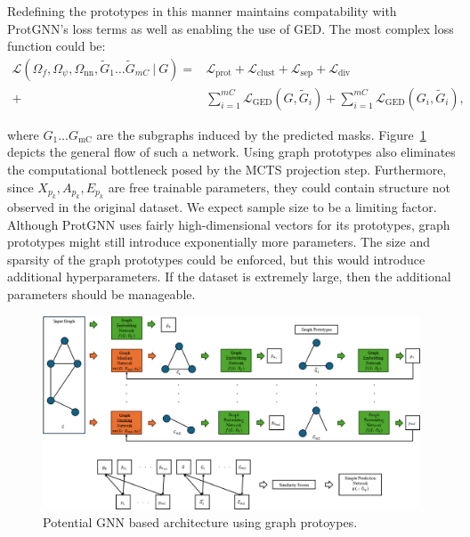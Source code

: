 \documentclass[
  11pt,
  letterpaper,
]{article}
\begin{document}
Redefining the prototypes in this manner maintains compatability with
ProtGNN's loss terms as well as enabling the use of GED. The most
complex loss function could be:\\
\begin{equation}
    \begin{split}
        \mathcal{L}(\Omega_f, \Omega_\psi, \Omega_\text{nn}, \tilde{G}_1 \dots \tilde{G}_{mC} \ | \ G) = &\mathcal{L}_\text{prot} + \mathcal{L}_\text{clust} + \mathcal{L}_\text{sep} + \mathcal{L}_\text{div} \\ + &\sum_{i = 1}^{mC} \mathcal{L}_\text{GED}(G, \tilde{G}_i) + \sum_{i = 1}^{mC} \mathcal{L}_\text{GED}(G_i, \tilde{G}_i), 
    \end{split}
\end{equation}

where \(G_1 \dots G_\text{mC}\) are the subgraphs induced by the
predicted masks. Figure~\ref{fig-graph-prot_diag} depicts the general
flow of such a network. Using graph prototypes also eliminates the
computational bottleneck posed by the MCTS projection step. Furthermore,
since \(X_{p_k}, A_{p_k}, E_{p_k}\) are free trainable parameters, they
could contain structure not observed in the original dataset. We expect
sample size to be a limiting factor. Although ProtGNN uses fairly
high-dimensional vectors for its prototypes, graph prototypes might
still introduce exponentially more parameters. The size and sparsity of
the graph prototypes could be enforced, but this would introduce
additional hyperparameters. If the dataset is extremely large, then the
additional parameters should be manageable.

\begin{figure}

{\centering \includegraphics{figures/Graph_prot_diagram.png}

}

\caption{\label{fig-graph-prot_diag}Potential GNN based architecture
using graph protoypes.}

\end{figure}
\end{document}
